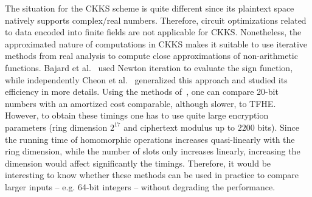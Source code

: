 The situation for the CKKS scheme is quite different since its plaintext space natively supports complex/real numbers. 
Therefore, circuit optimizations related to data encoded into finite fields are not applicable for CKKS. 
Nonetheless, the approximated nature of computations in CKKS makes it suitable to use iterative methods from real analysis to compute close approximations of non-arithmetic functions. 
Bajard et al.~\cite{BMSZ20} used Newton iteration to evaluate the sign function, while independently Cheon et al.~\cite{AC:CKKLL19,EPRINT:CheKimKim19} generalized this approach and studied its efficiency in more details. 
Using the methods of~\cite{EPRINT:CheKimKim19}, one can compare 20-bit numbers with an amortized cost comparable, although slower, to TFHE. 
However, to obtain these timings one has to use quite large encryption parameters (ring dimension $2^{17}$ and ciphertext modulus up to $2200$ bits). 
Since the running time of homomorphic operations increases quasi-linearly with the ring dimension, while the number of slots only increases linearly, increasing the dimension would affect significantly the timings. 
Therefore, it would be interesting to know whether these methods can be used in practice to compare larger inputs -- e.g. 64-bit integers -- without degrading the performance. 




  


